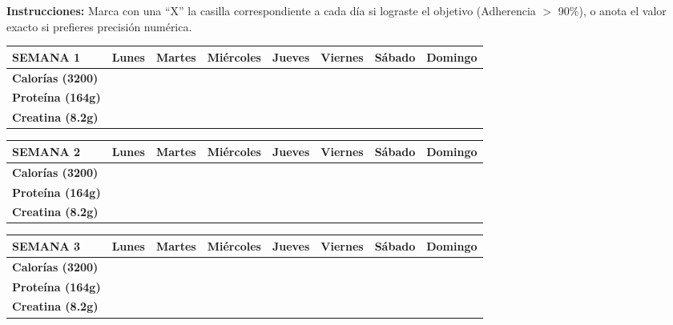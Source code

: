 \documentclass[10pt, a4paper]{article}
\renewcommand{\arraystretch}{1.6}
\begin{document}
\vspace{0.5cm}

\noindent \textbf{Instrucciones:} Marca con una ``X'' la casilla correspondiente a cada día si lograste el objetivo (Adherencia $>$ 90\%), o anota el valor exacto si prefieres precisión numérica. 

\vspace{0.5cm}

\renewcommand{\arraystretch}{2.2}

\begin{tabularx}{\textwidth}{|l|X|X|X|X|X|X|X|}
\hline
\rowcolor{gray!20}
\textbf{SEMANA 1} & \textbf{Lunes} & \textbf{Martes} & \textbf{Miércoles} & \textbf{Jueves} & \textbf{Viernes} & \textbf{Sábado} & \textbf{Domingo} \\ \hline
\textbf{Calorías (3200)} & & & & & & & \\ \hline
\textbf{Proteína (164g)} & & & & & & & \\ \hline
\textbf{Creatina (8.2g)} & & & & & & & \\ \hline
\end{tabularx}

\vspace{0.8cm}

\begin{tabularx}{\textwidth}{|l|X|X|X|X|X|X|X|}
\hline
\rowcolor{gray!20}
\textbf{SEMANA 2} & \textbf{Lunes} & \textbf{Martes} & \textbf{Miércoles} & \textbf{Jueves} & \textbf{Viernes} & \textbf{Sábado} & \textbf{Domingo} \\ \hline
\textbf{Calorías (3200)} & & & & & & & \\ \hline
\textbf{Proteína (164g)} & & & & & & & \\ \hline
\textbf{Creatina (8.2g)} & & & & & & & \\ \hline
\end{tabularx}

\vspace{0.8cm}

\begin{tabularx}{\textwidth}{|l|X|X|X|X|X|X|X|}
\hline
\rowcolor{gray!20}
\textbf{SEMANA 3} & \textbf{Lunes} & \textbf{Martes} & \textbf{Miércoles} & \textbf{Jueves} & \textbf{Viernes} & \textbf{Sábado} & \textbf{Domingo} \\ \hline
\textbf{Calorías (3200)} & & & & & & & \\ \hline
\textbf{Proteína (164g)} & & & & & & & \\ \hline
\textbf{Creatina (8.2g)} & & & & & & & \\ \hline
\end{tabularx}
\end{document}
